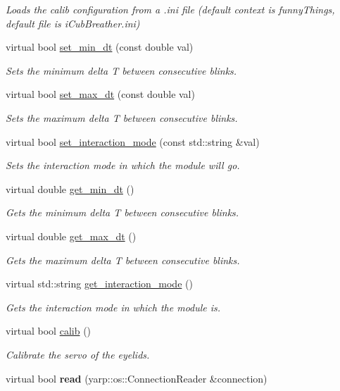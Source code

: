 \begin{DoxyCompactItemize}
\begin{DoxyCompactList}\small\item\em Loads the calib configuration from a .ini file (default context is funny\+Things, default file is i\+Cub\+Breather.\+ini) \end{DoxyCompactList}\item 
virtual bool \hyperlink{classiCubBlinker__IDL_ad4a144300d21ad36d6318b44ae470ac0}{set\+\_\+min\+\_\+dt} (const double val)
\begin{DoxyCompactList}\small\item\em Sets the minimum delta T between consecutive blinks. \end{DoxyCompactList}\item 
virtual bool \hyperlink{classiCubBlinker__IDL_a3256e776823f2e5f17ad41bcfbdc5974}{set\+\_\+max\+\_\+dt} (const double val)
\begin{DoxyCompactList}\small\item\em Sets the maximum delta T between consecutive blinks. \end{DoxyCompactList}\item 
virtual bool \hyperlink{classiCubBlinker__IDL_a5acfaf3d0bd98cf7376889f44e51aa4f}{set\+\_\+interaction\+\_\+mode} (const std\+::string \&val)
\begin{DoxyCompactList}\small\item\em Sets the interaction mode in which the module will go. \end{DoxyCompactList}\item 
virtual double \hyperlink{classiCubBlinker__IDL_a3f343f97c835d60c032a03f41a1b671d}{get\+\_\+min\+\_\+dt} ()
\begin{DoxyCompactList}\small\item\em Gets the minimum delta T between consecutive blinks. \end{DoxyCompactList}\item 
virtual double \hyperlink{classiCubBlinker__IDL_a172a5c1d4a247d1fd51c1364c33b4c66}{get\+\_\+max\+\_\+dt} ()
\begin{DoxyCompactList}\small\item\em Gets the maximum delta T between consecutive blinks. \end{DoxyCompactList}\item 
virtual std\+::string \hyperlink{classiCubBlinker__IDL_a9dd8118c490a28a0f5e70dfba2b49cb6}{get\+\_\+interaction\+\_\+mode} ()
\begin{DoxyCompactList}\small\item\em Gets the interaction mode in which the module is. \end{DoxyCompactList}\item 
virtual bool \hyperlink{classiCubBlinker__IDL_a1f6e2fc8b61ab1ad56d917c983ef98a2}{calib} ()
\begin{DoxyCompactList}\small\item\em Calibrate the servo of the eyelids. \end{DoxyCompactList}\item 
virtual bool {\bfseries read} (yarp\+::os\+::\+Connection\+Reader \&connection)\label{classiCubBlinker__IDL_a76b708bd15e25a5556a273e691fe76a5}


\end{DoxyCompactItemize}
